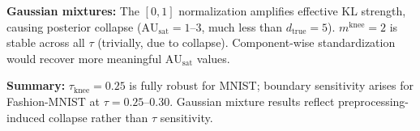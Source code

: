 \documentclass[12pt,a4paper]{article}
\newcommand{\AUsat}{\mathrm{AU}_{\mathrm{sat}}}
\newcommand{\mknee}{m^{\mathrm{knee}}}
\begin{document}
\textbf{Gaussian mixtures:}
The $[0,1]$ normalization amplifies effective KL strength, causing posterior collapse ($\AUsat = 1$--3, much less than $d_\mathrm{true}=5$).
$\mknee = 2$ is stable across all $\tau$ (trivially, due to collapse).
Component-wise standardization would recover more meaningful $\AUsat$ values.

\textbf{Summary:}
$\tau_\mathrm{knee}=0.25$ is fully robust for MNIST; boundary sensitivity arises for Fashion-MNIST at $\tau=0.25$--$0.30$.
Gaussian mixture results reflect preprocessing-induced collapse rather than $\tau$ sensitivity.
\end{document}
